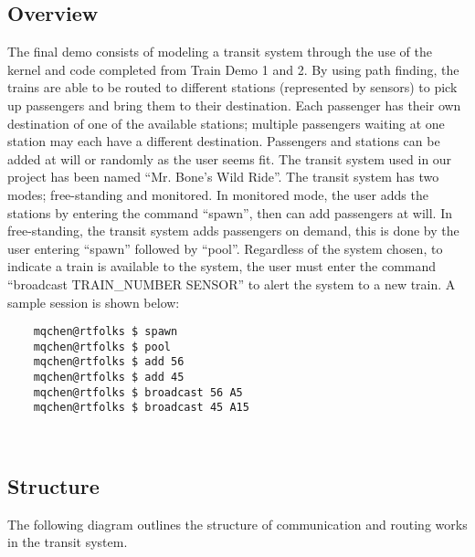 \documentclass[12pt]{article}
\begin{document}
\subsection{Overview}
The final demo consists of modeling a transit system through the use of the kernel and code completed from Train Demo 1 and 2.  By using path finding, the trains are able to be routed to different stations (represented by sensors) to pick up passengers and bring them to their destination.  Each passenger has their own destination of one of the available stations; multiple passengers waiting at one station may each have a different destination.  Passengers and stations can be added at will or randomly as the user seems fit.  The transit system used in our project has been named ``Mr. Bone's Wild Ride''.  The transit system has two modes; free-standing and monitored.  In monitored mode, the user adds the stations by entering the command ``spawn'', then can add passengers at will.  In free-standing, the transit system adds passengers on demand, this is done by the user entering ``spawn'' followed by ``pool''.  Regardless of the system chosen, to indicate a train is available to the system, the user must enter the command ``broadcast TRAIN_NUMBER SENSOR'' to alert the system to a new train.  A sample session is shown below:
\begin{center}
  \begin{verbatim}
    mqchen@rtfolks $ spawn
    mqchen@rtfolks $ pool
    mqchen@rtfolks $ add 56
    mqchen@rtfolks $ add 45
    mqchen@rtfolks $ broadcast 56 A5
    mqchen@rtfolks $ broadcast 45 A15
  \end{verbatim}
\end{center}
\\[1\baselineskip]
\subsection{Structure}
The following diagram outlines the structure of communication and routing works in the transit system.
\begin{center}
  \\[1\baselineskip]
\end{center}
\end{document}
